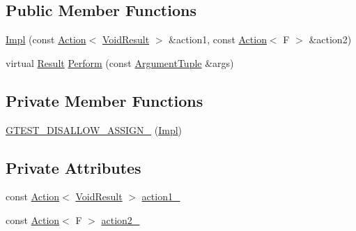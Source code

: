 \subsection*{Public Member Functions}
\begin{DoxyCompactItemize}
\item 
\hyperlink{classtesting_1_1internal_1_1DoBothAction_1_1Impl_a0808e190e7b2545bfd5bc0cc9bf4f4a4}{Impl} (const \hyperlink{classtesting_1_1Action}{Action}$<$ \hyperlink{classtesting_1_1internal_1_1DoBothAction_1_1Impl_a83909f0d1addcd1207ff45b128f33802}{Void\+Result} $>$ \&action1, const \hyperlink{classtesting_1_1Action}{Action}$<$ F $>$ \&action2)
\item 
virtual \hyperlink{classtesting_1_1ActionInterface_a7477de2fe3e4e01c59db698203acaee7}{Result} \hyperlink{classtesting_1_1internal_1_1DoBothAction_1_1Impl_aa8f102e1918e64266ddb9b00db2c4b5e}{Perform} (const \hyperlink{classtesting_1_1ActionInterface_af72720d864da4d606629e83edc003511}{Argument\+Tuple} \&args)
\end{DoxyCompactItemize}
\subsection*{Private Member Functions}
\begin{DoxyCompactItemize}
\item 
\hyperlink{classtesting_1_1internal_1_1DoBothAction_1_1Impl_a2c00537668b40a1e05f131c3d8e4e88b}{G\+T\+E\+S\+T\+\_\+\+D\+I\+S\+A\+L\+L\+O\+W\+\_\+\+A\+S\+S\+I\+G\+N\+\_\+} (\hyperlink{classtesting_1_1internal_1_1DoBothAction_1_1Impl}{Impl})
\end{DoxyCompactItemize}
\subsection*{Private Attributes}
\begin{DoxyCompactItemize}
\item 
const \hyperlink{classtesting_1_1Action}{Action}$<$ \hyperlink{classtesting_1_1internal_1_1DoBothAction_1_1Impl_a83909f0d1addcd1207ff45b128f33802}{Void\+Result} $>$ \hyperlink{classtesting_1_1internal_1_1DoBothAction_1_1Impl_af54fe7ce6f362c7ecae828804d18039a}{action1\+\_\+}
\item 
const \hyperlink{classtesting_1_1Action}{Action}$<$ F $>$ \hyperlink{classtesting_1_1internal_1_1DoBothAction_1_1Impl_af1f725e8d028c532c07ee606df35dc44}{action2\+\_\+}
\end{DoxyCompactItemize}


